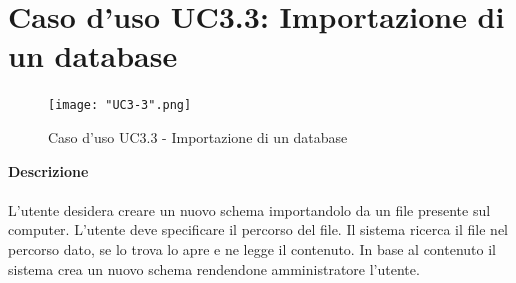\documentclass[a4paper]{report}
\begin{document}
	 \section{Caso d'uso UC3.3: Importazione di un database}
	 	\begin{figure}[H]
			\centering
			\texttt{[image: "UC3-3".png]}
			\caption{Caso d'uso UC3.3 - Importazione di un database}
		\end{figure}
	 \textbf{Descrizione} \\ \\
	 L'utente desidera creare un nuovo schema importandolo da un file presente sul computer. L'utente
	  deve specificare il percorso del file. Il sistema ricerca il file nel percorso dato, se lo trova lo apre e ne 
	  legge il contenuto. In base al contenuto il sistema crea un nuovo schema rendendone amministratore
	  l'utente.
\end{document}
